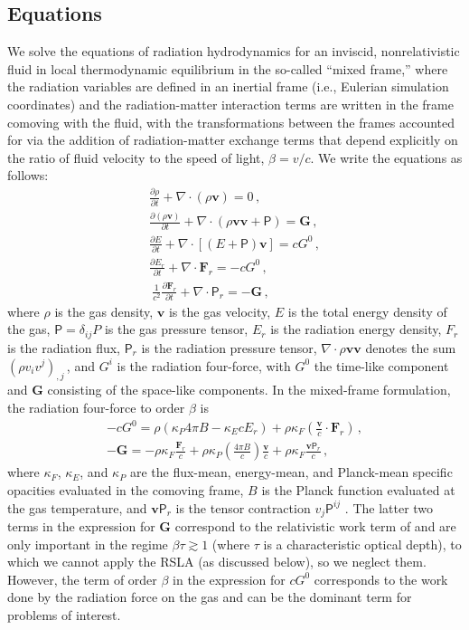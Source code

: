 \documentclass[fleqn,usenatbib]{mnras}
\newcommand{\vc}[1]{{\mathbf{#1}}}
\begin{document}
\subsection{Equations}
We solve the equations of radiation hydrodynamics \citep{Pomraning_1973,Mihalas_1984,Castor_2004} for an inviscid, nonrelativistic fluid in local thermodynamic equilibrium in the so-called ``mixed frame,'' where the radiation variables are defined in an inertial frame (i.e., Eulerian simulation coordinates) and the radiation-matter interaction terms are written in the frame comoving with the fluid, with the transformations between the frames accounted for via the addition of radiation-matter exchange terms that depend explicitly on the ratio of fluid velocity to the speed of light, $\beta=v/c$.
We write the equations as follows:
\begin{align}
    \frac{\partial \rho}{\partial t} + \nabla \cdot (\rho \vc{v}) = 0 \, , \\
    \frac{\partial (\rho \vc{v})}{\partial t} + \nabla \cdot (\rho \vc{v} \vc{v} + \mathsf{P}) = \vc{G} \, , \\
    \frac{\partial E}{\partial t} + \nabla \cdot \left[(E + \mathsf{P})\vc{v}\right] = c G^0 \, , \\
    \frac{\partial E_r}{\partial t} + \nabla \cdot {\vc{F}_r} = -c G^0 \, , \\\
    \frac{1}{c^2}\frac{\partial \vc{F}_r}{\partial t} + \nabla \cdot \mathsf{P}_r = -\vc{G} \, ,
\end{align}
where $\rho$ is the gas density, $\vc{v}$ is the gas velocity, $E$ is the total energy density of the gas, $\mathsf{P} = \delta_{ij} P$ is the gas pressure tensor, $E_r$ is the radiation energy density, $F_r$ is the radiation flux, $\mathsf{P}_r$ is the radiation pressure tensor, $\nabla \cdot \rho \vc{v} \vc{v}$ denotes the sum $(\rho v_i v^j)_{,j}\,$, and $G^i$ is the radiation four-force, with $G^0$ the time-like component and $\vc{G}$ consisting of the space-like components. In the mixed-frame formulation, the radiation four-force to order $\beta$ is
\begin{align}
-c G^0 = \rho (\kappa_P 4 \pi B - \kappa_E c E_r) + \rho \kappa_F \left( \frac{\vc{v}}{c} \cdot \vc{F}_r \right) \, , \\
-\vc{G} = -\rho \kappa_F \frac{\vc{F}_r}{c} + \rho \kappa_P \left(\frac{4 \pi B}{c}\right) \frac{\vc{v}}{c} + \rho \kappa_F \frac{\vc{v}\mathsf{P}_r}{c} \, ,
\end{align}
where
$\kappa_F$, $\kappa_E$, and $\kappa_P$ are the flux-mean, energy-mean, and Planck-mean specific opacities evaluated in the comoving frame,
$B$ is the Planck function evaluated at the gas temperature,
and $\vc{v} \mathsf{P}_r$ is the tensor contraction $v_j \mathsf{P}^{ij}$ \citep{Mihalas_1984}. The latter two terms in the expression for $\vc{G}$ correspond to the relativistic work term of \cite{Krumholz_2007} and are only important in the regime $\beta \tau \gtrsim 1$ (where $\tau$ is a characteristic optical depth), 
to which we cannot apply the RSLA (as discussed below),
so we neglect them. However, the term of order $\beta$ in the expression for $cG^0$ corresponds to the work done by the radiation force on the gas and can be the dominant term for problems of interest. 
\end{document}
